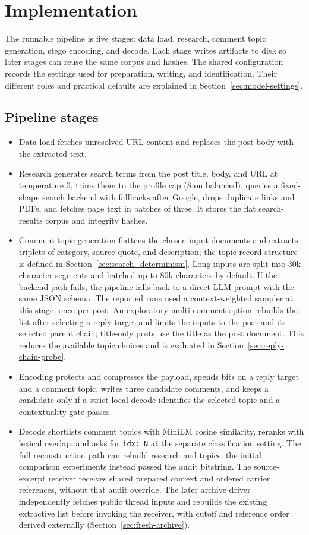 \section{Implementation}
\label{sec:implementation}

The runnable pipeline is five stages: data load, research, comment topic generation, stego encoding, and decode.
Each stage writes artifacts to disk so later stages can reuse the same corpus and hashes.
The shared configuration records the settings used for preparation, writing, and identification. Their different roles and practical defaults are explained in Section~\ref{sec:model-settings}.

\subsection{Pipeline stages}
\begin{itemize}
    \item Data load fetches unresolved URL content and replaces the post body with the extracted text.
    \item Research generates search terms from the post title, body, and URL at temperature 0, trims them to the profile cap (8 on balanced), queries a fixed-shape search backend with fallbacks after Google, drops duplicate links and PDFs, and fetches page text in batches of three. It stores the flat search-results corpus and integrity hashes.
    \item Comment-topic generation flattens the chosen input documents and extracts triplets of category, source quote, and description; the topic-record structure is defined in Section~\ref{sec:search_determinism}. Long inputs are split into 30k-character segments and batched up to 80k characters by default. If the backend path fails, the pipeline falls back to a direct LLM prompt with the same JSON schema. The reported runs used a context-weighted sampler at this stage, once per post. An exploratory multi-comment option rebuilds the list after selecting a reply target and limits the inputs to the post and its selected parent chain; title-only posts use the title as the post document. This reduces the available topic choices and is evaluated in Section~\ref{sec:reply-chain-probe}.
    \item Encoding protects and compresses the payload, spends bits on a reply target and a comment topic, writes three candidate comments, and keeps a candidate only if a strict local decode identifies the selected topic and a contextuality gate passes.
    \item Decode shortlists comment topics with MiniLM cosine similarity, reranks with lexical overlap, and asks for \texttt{idx: N} at the separate classification setting. The full reconstruction path can rebuild research and topics; the initial comparison experiments instead passed the audit bitstring. The source-excerpt receiver receives shared prepared context and ordered carrier references, without that audit override. The later archive driver independently fetches public thread inputs and rebuilds the existing extractive list before invoking the receiver, with cutoff and reference order derived externally (Section~\ref{sec:fresh-archive}).
\end{itemize}
